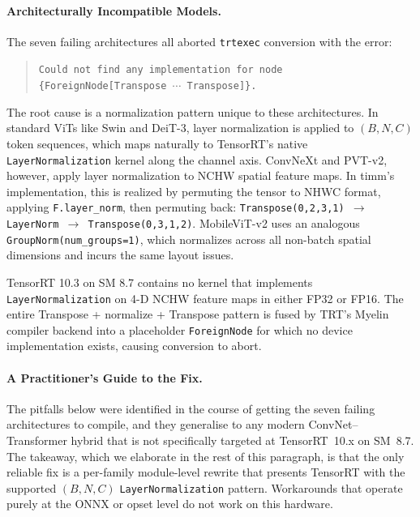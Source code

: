 \documentclass[runningheads,a4paper]{llncs}
\begin{document}
\begin{table}[!htbp]
\centering
\caption{Unified native TensorRT inference latency on the Jetson Orin Nano (batch size 1, $96\times96$ input, MAXN\_SUPER, locked clocks). All sixteen baseline architectures execute as native TRT engines after applying the per-family rewrites of Section~\ref{sec:trt-compat-success} where required. INT8 uses TRT's built-in PTQ calibration and is reported only for the nine originally TRT-compatible models.}
\label{tab:jetson-latency-full}
\footnotesize

\end{table}

\paragraph{Architecturally Incompatible Models.}
The seven failing architectures all aborted \texttt{trtexec} conversion with the error:

\begin{quote}
\texttt{Could not find any implementation for node \{ForeignNode[Transpose $\cdots$ Transpose]\}.}
\end{quote}

The root cause is a normalization pattern unique to these architectures. In standard ViTs like Swin and DeiT-3, layer normalization is applied to $(B,N,C)$ token sequences, which maps naturally to TensorRT's native \texttt{LayerNormalization} kernel along the channel axis. ConvNeXt and PVT-v2, however, apply layer normalization to NCHW spatial feature maps. In timm's implementation, this is realized by permuting the tensor to NHWC format, applying \texttt{F.layer\_norm}, then permuting back: \texttt{Transpose(0,2,3,1) $\rightarrow$ LayerNorm $\rightarrow$ Transpose(0,3,1,2)}. MobileViT-v2 uses an analogous \texttt{GroupNorm(num\_groups=1)}, which normalizes across all non-batch spatial dimensions and incurs the same layout issues.

TensorRT 10.3 on SM 8.7 contains no kernel that implements \texttt{LayerNormalization} on 4-D NCHW feature maps in either FP32 or FP16. The entire Transpose + normalize + Transpose pattern is fused by TRT's Myelin compiler backend into a placeholder \texttt{ForeignNode} for which no device implementation exists, causing conversion to abort.

\paragraph{A Practitioner's Guide to the Fix.}\label{sec:trt-compat-success}
The pitfalls below were identified in the course of getting the seven failing architectures to compile, and they generalise to any modern ConvNet--Transformer hybrid that is not specifically targeted at TensorRT~10.x on SM~8.7. The takeaway, which we elaborate in the rest of this paragraph, is that the only reliable fix is a per-family module-level rewrite that presents TensorRT with the supported $(B,N,C)$ \texttt{LayerNormalization} pattern. Workarounds that operate purely at the ONNX or opset level do not work on this hardware.
\end{document}
